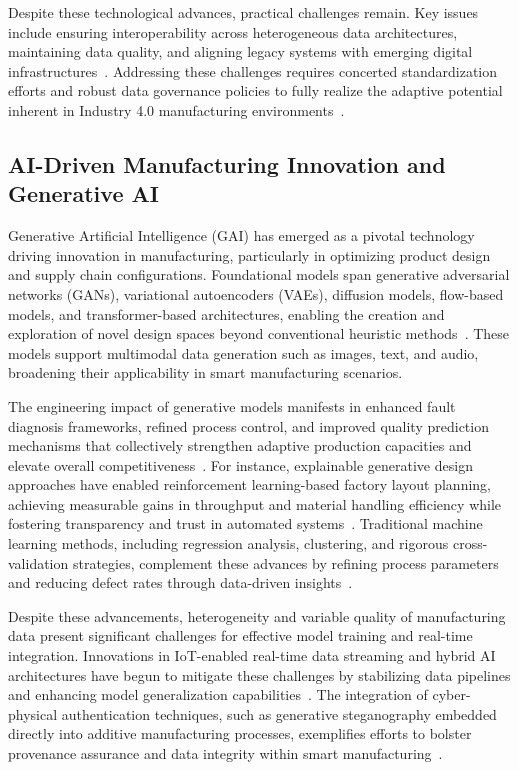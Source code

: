 \documentclass[sigconf]{acmart}
\begin{document}
Despite these technological advances, practical challenges remain. Key issues include ensuring interoperability across heterogeneous data architectures, maintaining data quality, and aligning legacy systems with emerging digital infrastructures~\cite{ref42}. Addressing these challenges requires concerted standardization efforts and robust data governance policies to fully realize the adaptive potential inherent in Industry 4.0 manufacturing environments~\cite{ref38,ref42}.

\subsection{AI-Driven Manufacturing Innovation and Generative AI}

Generative Artificial Intelligence (GAI) has emerged as a pivotal technology driving innovation in manufacturing, particularly in optimizing product design and supply chain configurations. Foundational models span generative adversarial networks (GANs), variational autoencoders (VAEs), diffusion models, flow-based models, and transformer-based architectures, enabling the creation and exploration of novel design spaces beyond conventional heuristic methods~\cite{ref1,ref8}. These models support multimodal data generation such as images, text, and audio, broadening their applicability in smart manufacturing scenarios.

The engineering impact of generative models manifests in enhanced fault diagnosis frameworks, refined process control, and improved quality prediction mechanisms that collectively strengthen adaptive production capacities and elevate overall competitiveness~\cite{ref7,ref9,ref36}. For instance, explainable generative design approaches have enabled reinforcement learning-based factory layout planning, achieving measurable gains in throughput and material handling efficiency while fostering transparency and trust in automated systems~\cite{ref9}. Traditional machine learning methods, including regression analysis, clustering, and rigorous cross-validation strategies, complement these advances by refining process parameters and reducing defect rates through data-driven insights~\cite{ref10,ref13}.

Despite these advancements, heterogeneity and variable quality of manufacturing data present significant challenges for effective model training and real-time integration. Innovations in IoT-enabled real-time data streaming and hybrid AI architectures have begun to mitigate these challenges by stabilizing data pipelines and enhancing model generalization capabilities~\cite{ref20,ref29}. The integration of cyber-physical authentication techniques, such as generative steganography embedded directly into additive manufacturing processes, exemplifies efforts to bolster provenance assurance and data integrity within smart manufacturing~\cite{ref10}.
\end{document}
